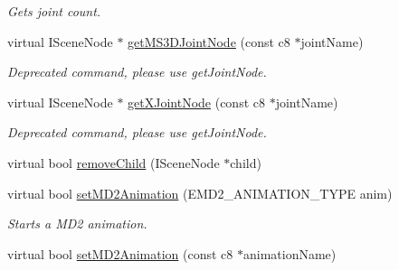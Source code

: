 \begin{DoxyCompactItemize}
\begin{DoxyCompactList}\small\item\em Gets joint count. \end{DoxyCompactList}\item 
virtual I\-Scene\-Node $\ast$ \hyperlink{classirr_1_1scene_1_1_c_animated_mesh_scene_node_af27483f92b24280c49e23c9aa8114f9f}{get\-M\-S3\-D\-Joint\-Node} (const c8 $\ast$joint\-Name)
\begin{DoxyCompactList}\small\item\em Deprecated command, please use get\-Joint\-Node. \end{DoxyCompactList}\item 
virtual I\-Scene\-Node $\ast$ \hyperlink{classirr_1_1scene_1_1_c_animated_mesh_scene_node_a1b56c21746351ffa00c14033f0d32c1a}{get\-X\-Joint\-Node} (const c8 $\ast$joint\-Name)
\begin{DoxyCompactList}\small\item\em Deprecated command, please use get\-Joint\-Node. \end{DoxyCompactList}\item 
virtual bool \hyperlink{classirr_1_1scene_1_1_c_animated_mesh_scene_node_a671d27569a573b17018dbce14718591b}{remove\-Child} (I\-Scene\-Node $\ast$child)
\item 
\hypertarget{classirr_1_1scene_1_1_c_animated_mesh_scene_node_a239b5a421567ecd7c7c25ca110a930d8}{virtual bool \hyperlink{classirr_1_1scene_1_1_c_animated_mesh_scene_node_a239b5a421567ecd7c7c25ca110a930d8}{set\-M\-D2\-Animation} (E\-M\-D2\-\_\-\-A\-N\-I\-M\-A\-T\-I\-O\-N\-\_\-\-T\-Y\-P\-E anim)}\label{classirr_1_1scene_1_1_c_animated_mesh_scene_node_a239b5a421567ecd7c7c25ca110a930d8}

\begin{DoxyCompactList}\small\item\em Starts a M\-D2 animation. \end{DoxyCompactList}\item 
\hypertarget{classirr_1_1scene_1_1_c_animated_mesh_scene_node_a562b0394299b66c542204ea7fa9e0322}{virtual bool \hyperlink{classirr_1_1scene_1_1_c_animated_mesh_scene_node_a562b0394299b66c542204ea7fa9e0322}{set\-M\-D2\-Animation} (const c8 $\ast$animation\-Name)}\label{classirr_1_1scene_1_1_c_animated_mesh_scene_node_a562b0394299b66c542204ea7fa9e0322}


\end{DoxyCompactItemize}
